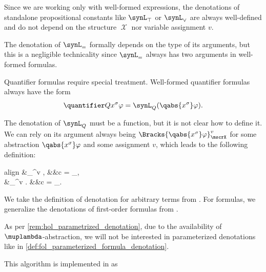 \begin{algorithm}
  Since we are working only with well-formed expressions, the denotations of standalone propositional constants like \( \synL_\top \) or \( \synL_\vee \) are always well-defined and do not depend on the structure \( \mscrX \) nor variable assignment \( v \).

  The denotation of \( \synL_= \) formally depends on the type of its arguments, but this is a negligible technicality since \( \synL_= \) always has two arguments in well-formed formulas.

  Quantifier formulas require special treatment. Well-formed quantifier formulas always have the form
  \begin{equation*}
    \quantifier Q {x^{\sigma}} \varphi = \synL_Q (\qabs {x^{\sigma}} \varphi).
  \end{equation*}

  The denotation of \( \synL_Q \) must be a function, but it is not clear how to define it. We can rely on its argument always being \( \Bracks{\qabs {x^\sigma} \varphi}_\mscrX^v \) for some abstraction \( \qabs {x^\sigma} \varphi \) and some assignment \( v \), which leads to the following definition:
  \begin{empheq}[left={\Bracks{c}_\mscrX^v} \coloneqq \empheqlbrace]{align}
    &_\mscrX^v \mapsto \bigwedge{}, &&c = \synL_\forall, \label{eq:alg:hol_denotation/l_const/forall} \\
    &_\mscrX^v \mapsto \bigvee{}.   &&c = \synL_\exists. \label{eq:alg:hol_denotation/l_const/exists}
  \end{empheq}
\end{algorithm}
\begin{comments}
  \item We take the definition of denotation for arbitrary terms from \cite[238]{Andrews2002Logic}. For formulas, we generalize the denotations of first-order formulas from .

  \item As per \cref{rem:hol_parametrized_denotation}, due to the availability of \( \muplambda \)-abstraction, we will not be interested in parameterized denotations like in \cref{def:fol_parameterized_formula_denotation}.

  \item This algorithm is implemented in \cite{notebook:code} as
  \begin{CodeRefDisplay}
  \end{CodeRefDisplay}
\end{comments}

